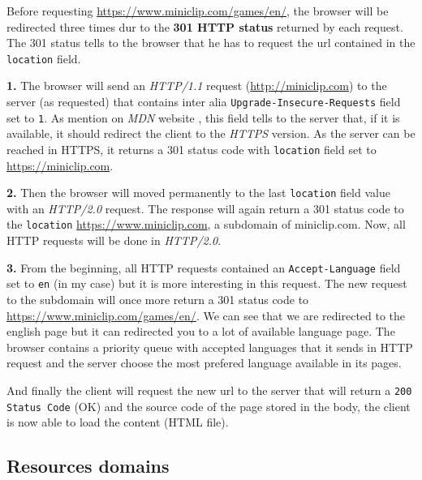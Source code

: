 \documentclass{article}
\begin{document}
Before requesting \url{https://www.miniclip.com/games/en/}, the browser will be redirected three times dur to the \textbf{301 HTTP status} returned by each request. The 301 status tells to the browser that he has to request the url contained in the \texttt{location} field.


\textbf{1.}
The browser will send an \textit{HTTP/1.1} request (\url{http://miniclip.com}) to the server (as requested) that contains inter alia \texttt{Upgrade-Insecure-Requests} field set to \texttt{1}. As mention on \textit{MDN} website \cite{upgrade-insecure-request}, this field tells to the server that, if it is available, it should redirect the client to the \textit{HTTPS} version. As the server can be reached in HTTPS, it returns a 301 status code with \texttt{location} field set to \url{https://miniclip.com}.

\textbf{2.} 
Then the browser will moved permanently to the last \texttt{location} field value with an \textit{HTTP/2.0} request. The response will again return a 301 status code to the \texttt{location} \url{https://www.miniclip.com}, a subdomain of miniclip.com. Now, all HTTP requests will be done in \textit{HTTP/2.0}.

\textbf{3.}
From the beginning, all HTTP requests contained an \texttt{Accept-Language} field set to \texttt{en} (in my case) but it is more interesting in this request. The new request to the subdomain will once more return a 301 status code to \url{https://www.miniclip.com/games/en/}. We can see that we are redirected to the english page but it can redirected you to a lot of available language page. The browser contains a priority queue with accepted languages that it sends in HTTP request and the server choose the most prefered language available in its pages.


And finally the client will request the new url to the server that will return a \texttt{200 Status Code} (OK) and the
source code of the page stored in the body, the client is now able to load the content (HTML file).

\subsection{Resources domains}
\label{sub:resdom}
\end{document}
